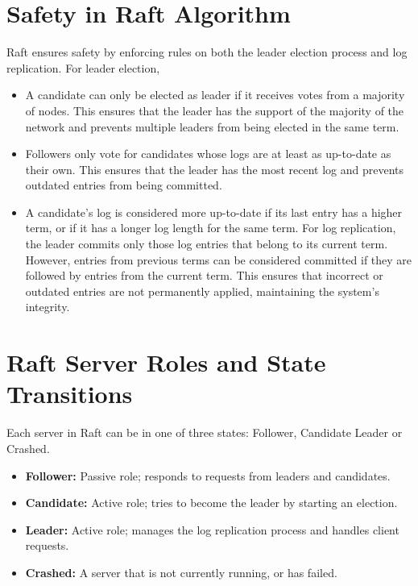 \section{Safety in Raft Algorithm}

Raft ensures safety by enforcing rules on both the leader election process and
log replication. For leader election,

\begin{itemize}
    \item A candidate can only be elected as leader if it receives votes from a majority
        of nodes. This ensures that the leader has the support of the majority
        of the network and prevents multiple leaders from being elected in the
        same term.

    \item Followers only vote for candidates whose logs are at least as up-to-date
        as their own. This ensures that the leader has the most recent log and
        prevents outdated entries from being committed.

    \item A candidate's log is considered more up-to-date if its last entry has a
        higher term, or if it has a longer log length for the same term. For log
        replication, the leader commits only those log entries that belong to
        its current term. However, entries from previous terms can be considered
        committed if they are followed by entries from the current term. This ensures
        that incorrect or outdated entries are not permanently applied,
        maintaining the system's integrity.
\end{itemize}

\section{Raft Server Roles and State Transitions}

Each server in Raft can be in one of three states: Follower, Candidate Leader or
Crashed.
\begin{itemize}
    \item \textbf{Follower:} Passive role; responds to requests from leaders and
        candidates.

    \item \textbf{Candidate:} Active role; tries to become the leader by starting
        an election.

    \item \textbf{Leader:} Active role; manages the log replication process and handles
        client requests.

    \item \textbf{Crashed:} A server that is not currently running, or has failed.
\end{itemize}

